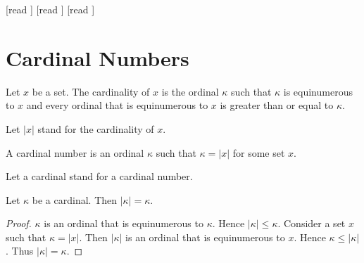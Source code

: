 \documentclass[10pt]{article}
\begin{document}
  \begin{imports}
    \begin{forthel}
      [read ]
      [read ]
      [read ]
    \end{forthel}
  \end{imports}


  \section*{Cardinal Numbers}

  \begin{forthel}
    \begin{definition}[id=SET_THEORY_06_8286266038681600,printid]
      Let $x$ be a set.
      The cardinality of $x$ is the ordinal $\kappa$ such that $\kappa$ is equinumerous to $x$ and every ordinal that is equinumerous to $x$ is greater than or equal to $\kappa$.
    \end{definition}

    Let $|x|$ stand for the cardinality of $x$.
  \end{forthel}

  \begin{forthel}
    \begin{definition}[id=SET_THEORY_06_6818986081648640,printid]
      A cardinal number is an ordinal $\kappa$ such that $\kappa = |x|$ for some
      set $x$.
    \end{definition}

    Let a cardinal stand for a cardinal number.
  \end{forthel}

  \begin{forthel}
    \begin{proposition}[id=SET_THEORY_06_2820082336006144,printid]
      Let $\kappa$ be a cardinal.
      Then $|\kappa| = \kappa$.
    \end{proposition}
    \begin{proof}
      $\kappa$ is an ordinal that is equinumerous to $\kappa$.
      Hence $|\kappa| \leq \kappa$.
      Consider a set $x$ such that $\kappa = |x|$.
      Then $|\kappa|$ is an ordinal that is equinumerous to $x$.
      Hence $\kappa \leq |\kappa|$.
      Thus $|\kappa| = \kappa$.
    \end{proof}
  \end{forthel}
\end{document}
